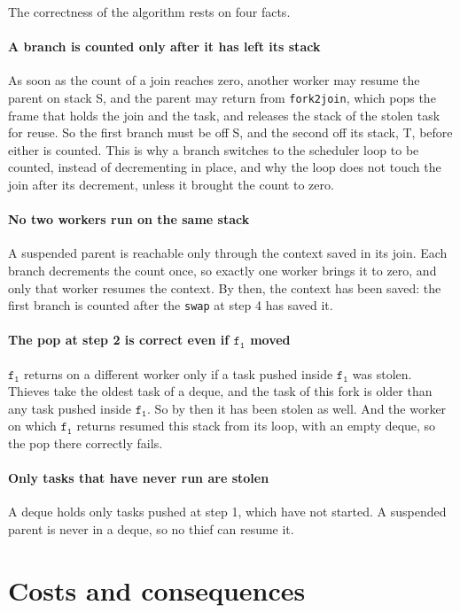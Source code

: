 \documentclass[sigplan,nonacm]{acmart}
\newcommand{\fo}{\mathtt{f_1}}
\begin{document}
The correctness of the algorithm rests on four facts.

\paragraph{A branch is counted only after it has left its stack}
%
As soon as the count of a join reaches zero, another worker may resume
the parent on stack S, and the parent may return from
\lstinline|fork2join|, which pops the frame that holds the join and the
task, and releases the stack of the stolen task for reuse.
%
So the first branch must be off S, and the second off its stack, T,
before either is counted.
%
This is why a branch switches to the scheduler loop to be counted,
instead of decrementing in place, and why the loop does not touch the
join after its decrement, unless it brought the count to zero.

\paragraph{No two workers run on the same stack}
%
A suspended parent is reachable only through the context saved in its
join.
%
Each branch decrements the count once, so exactly one worker brings it
to zero, and only that worker resumes the context.
%
By then, the context has been saved: the first branch is counted after
the \lstinline|swap| at step 4 has saved it.

\paragraph{The pop at step 2 is correct even if $\fo$ moved}
%
$\fo$ returns on a different worker only if a task pushed inside $\fo$
was stolen.
%
Thieves take the oldest task of a deque, and the task of this fork is
older than any task pushed inside $\fo$.
%
So by then it has been stolen as well.
%
And the worker on which $\fo$ returns resumed this stack from its loop,
with an empty deque, so the pop there correctly fails.

\paragraph{Only tasks that have never run are stolen}
%
A deque holds only tasks pushed at step 1, which have not started.
%
A suspended parent is never in a deque, so no thief can resume it.

\section{Costs and consequences}
\label{sec:costs}
\end{document}
